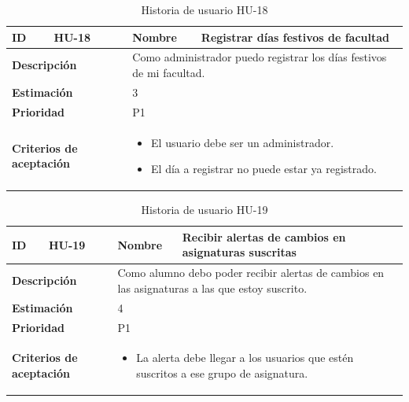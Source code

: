 \begin{table}[H]
    \centering
    \begin{tabular}{|p{2cm}|p{4cm}|p{2cm}|p{4cm}|}
        \hline
        \textbf{ID} & HU-18 & \textbf{Nombre} & Registrar días festivos de facultad \\
        \hline
        \multicolumn{2}{|p{6cm}|}{\textbf{Descripción}} & \multicolumn{2}{p{6cm}|}{Como administrador puedo registrar los días festivos de mi facultad.} \\
        \hline
        \multicolumn{2}{|p{6cm}|}{\textbf{Estimación}} & \multicolumn{2}{p{6cm}|}{3} \\
        \hline
        \multicolumn{2}{|p{6cm}|}{\textbf{Prioridad}} & \multicolumn{2}{p{6cm}|}{P1} \\
        \hline
        \multicolumn{2}{|p{6cm}|}{\textbf{Criterios de aceptación}} & \multicolumn{2}{p{6cm}|}{
            \begin{itemize}
                \item El usuario debe ser un administrador.
                \item El día a registrar no puede estar ya registrado.
            \end{itemize}
        } \\
        \hline
    \end{tabular}
    \caption{Historia de usuario HU-18}
    \label{tab:hu_18}
\end{table}

\begin{table}[H]
    \centering
    \begin{tabular}{|p{2cm}|p{4cm}|p{2cm}|p{4cm}|}
        \hline
        \textbf{ID} & HU-19 & \textbf{Nombre} & Recibir alertas de cambios en asignaturas suscritas \\
        \hline
        \multicolumn{2}{|p{6cm}|}{\textbf{Descripción}} & \multicolumn{2}{p{6cm}|}{Como alumno debo poder recibir alertas de cambios en las asignaturas a las que estoy suscrito.} \\
        \hline
        \multicolumn{2}{|p{6cm}|}{\textbf{Estimación}} & \multicolumn{2}{p{6cm}|}{4} \\
        \hline
        \multicolumn{2}{|p{6cm}|}{\textbf{Prioridad}} & \multicolumn{2}{p{6cm}|}{P1} \\
        \hline
        \multicolumn{2}{|p{6cm}|}{\textbf{Criterios de aceptación}} & \multicolumn{2}{p{6cm}|}{
            \begin{itemize}
                \item La alerta debe llegar a los usuarios que estén suscritos a ese grupo de asignatura.
            \end{itemize}
        } \\
        \hline
    \end{tabular}
    \caption{Historia de usuario HU-19}
    \label{tab:hu_19}
\end{table}

